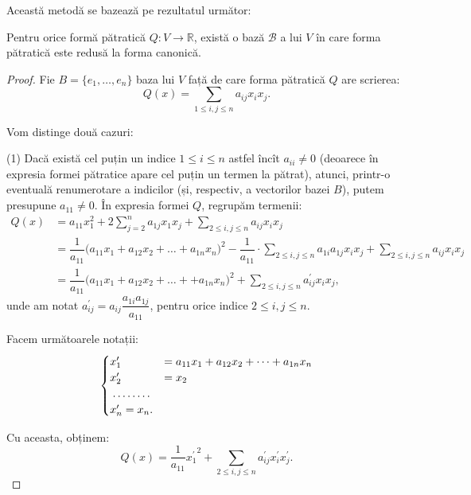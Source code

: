 \indent\indent Această metodă se bazează pe rezultatul următor:

\begin{theorem}
	Pentru orice formă pătratică $Q : V \to \mathbb{R}$, există o bază 
$\mathcal{B}$ a lui $V$ în care forma pătratică este redusă la forma canonică.
\end{theorem}

\begin{proof}
	Fie $B = \{e_1, \dots, e_n\}$ baza lui $V$ față de care forma pătratică $Q$
are scrierea: 
 \[
	Q(x) = \sum_{1 \leq i, j \leq n} a_{ij} x_i x_j.
\]

Vom distinge două cazuri:

(1) Dacă există cel puțin un indice $1 \leq i \leq n$ astfel încît 
$a_{ii} \neq 0$ (deoarece în expresia formei pătratice apare cel puțin un termen
la pătrat), atunci, printr-o eventuală renumerotare a indicilor (și, respectiv,
a vectorilor bazei $B$), putem presupune $a_{11} \neq 0$. În expresia formei
$Q$, regrupăm termenii:
\begin{align*}
Q(x) &= a_{11}x_1^2 + 2 \sum_{j = 2}^n a_{1j} x_1 x_j + 
                        \sum_{2 \leq i,j \leq n} a_{ij} x_i x_j \\
     &= \dfrac{1}{a_{11}} \big( a_{11} x_1 + a_{12} x_2 + \dots +
                  a_{1n} x_n \big)^2 - \dfrac{1}{a_{11}} \cdot
                  \sum_{2 \leq i, j \leq n} a_{1i} a_{1j} x_i x_j +
                  \sum_{2 \leq i, j \leq n} a_{ij} x_i x_j \\
     &= \dfrac{1}{a_{11}} \big( a_{11} x_1 + a_{12} x_2 + \dots +
                            + a_{1n} x_n \big)^2 +
                        \sum_{2 \leq i, j \leq n} a^{\prime}_{ij} x_i x_j,
\end{align*}
unde am notat $a^{\prime}_{ij} = a_{ij} \dfrac{a_{1i} a_{1j}}{a_{11}}$, pentru
orice indice $2 \leq i, j \leq n$.

Facem următoarele notații: 
 \[
	\begin{cases}	
	    x^{\prime}_1 &= a_{11}x_1 + a_{12} x_2 + \dots + a_{1n} x_n \\
	    x^{\prime}_2 &= x_2 \\
	    \dotfill \\
	    x^{\prime}_n = x_n.
    \end{cases}
\]

Cu aceasta, obținem: 
 \[
	Q(x) = \dfrac{1}{a_{11}} {x_1^{\prime}}^2 + 
	        \sum_{2 \leq i,j \leq n} a^{\prime}_{ij} x^{\prime}_i x^{\prime}_j.
\]


\end{proof}
